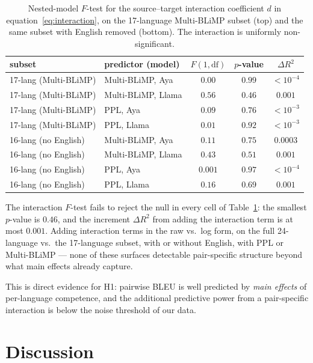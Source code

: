 \documentclass[11pt]{article}
\begin{document}
\begin{table}[h]
\centering
\small
\begin{tabular}{llccc}
\toprule
subset & predictor (model) & $F(1, \mathrm{df})$ & $p$-value & $\Delta R^2$ \\
\midrule
17-lang (Multi-BLiMP) & Multi-BLiMP, Aya   & $0.00$ & $0.99$ & $<\!10^{-4}$ \\
17-lang (Multi-BLiMP) & Multi-BLiMP, Llama & $0.56$ & $0.46$ & $0.001$ \\
17-lang (Multi-BLiMP) & PPL, Aya           & $0.09$ & $0.76$ & $<\!10^{-3}$ \\
17-lang (Multi-BLiMP) & PPL, Llama         & $0.01$ & $0.92$ & $<\!10^{-3}$ \\
\midrule
16-lang (no English)  & Multi-BLiMP, Aya   & $0.11$ & $0.75$ & $0.0003$ \\
16-lang (no English)  & Multi-BLiMP, Llama & $0.43$ & $0.51$ & $0.001$ \\
16-lang (no English)  & PPL, Aya           & $0.001$ & $0.97$ & $<\!10^{-4}$ \\
16-lang (no English)  & PPL, Llama         & $0.16$ & $0.69$ & $0.001$ \\
\bottomrule
\end{tabular}
\caption{Nested-model $F$-test for the source--target interaction
coefficient $d$ in equation~\eqref{eq:interaction}, on the
17-language Multi-BLiMP subset (top) and the same subset with English
removed (bottom). The interaction is uniformly non-significant.}
\label{tab:interaction}
\end{table}

The interaction $F$-test fails to reject the null in every cell of
Table~\ref{tab:interaction}: the smallest $p$-value is $0.46$, and
the increment $\Delta R^2$ from adding the interaction term is at
most $0.001$. Adding interaction terms in the raw vs.~log form, on
the full 24-language vs.~the 17-language subset, with or without
English, with PPL or Multi-BLiMP --- none of these surfaces detectable
pair-specific structure beyond what main effects already capture.

This is direct evidence for H1: pairwise BLEU is well predicted by
\emph{main effects} of per-language competence, and the additional
predictive power from a pair-specific interaction is below the noise
threshold of our data.

\section{Discussion}
\end{document}
